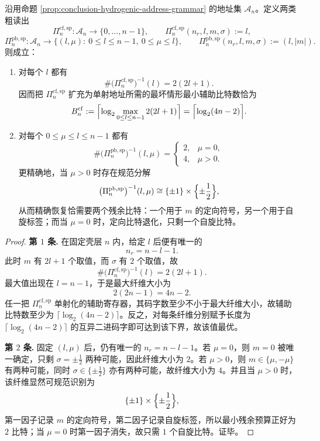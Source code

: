 \begin{theorem}[氢型粗读出的残余审计容量律]\label{thm:conclusion-hydrogenic-residual-audit-capacity}
沿用命题 \ref{prop:conclusion-hydrogenic-address-grammar} 的地址集 \(\mathcal A_n\)。定义两类粗读出
\[
\Pi_n^{\mathrm{cf,sp}}:\mathcal A_n\to \{0,\dots,n-1\},
\qquad
\Pi_n^{\mathrm{cf,sp}}(n_r,l,m,\sigma):=l,
\]
\[
\Pi_n^{\mathrm{pb,sp}}:\mathcal A_n\to \{(l,\mu):\ 0\le l\le n-1,\ 0\le \mu\le l\},
\qquad
\Pi_n^{\mathrm{pb,sp}}(n_r,l,m,\sigma):=(l,|m|).
\]
则成立：
\begin{enumerate}
  \item 对每个 \(l\) 都有
  \[
  \#\bigl(\Pi_n^{\mathrm{cf,sp}}\bigr)^{-1}(l)=2(2l+1).
  \]
  因而把 \(\Pi_n^{\mathrm{cf,sp}}\) 扩充为单射地址所需的最坏情形最小辅助比特数恰为
  \[
  B_n^{\mathrm{cf}}
  :=
  \Bigl\lceil
  \log_2
  \max_{0\le l\le n-1}2(2l+1)
  \Bigr\rceil
  =
  \Bigl\lceil \log_2(4n-2)\Bigr\rceil.
  \]
  \item 对每个 \(0\le \mu\le l\le n-1\) 都有
  \[
  \#\bigl(\Pi_n^{\mathrm{pb,sp}}\bigr)^{-1}(l,\mu)
  =
  \begin{cases}
  2, & \mu=0,\\[4pt]
  4, & \mu>0.
  \end{cases}
  \]
  更精确地，当 \(\mu>0\) 时存在规范分解
  \[
  \bigl(\Pi_n^{\mathrm{pb,sp}}\bigr)^{-1}(l,\mu)
  \cong
  \{\pm1\}\times \Bigl\{\pm\frac12\Bigr\},
  \]
  从而精确恢复恰需要两个残余比特：一个用于 \(m\) 的定向符号，另一个用于自旋标签；而当 \(\mu=0\) 时，定向比特退化，只剩一个自旋比特。
\end{enumerate}
\end{theorem}
\begin{proof}
\textbf{第 \(1\) 条.}
在固定壳层 \(n\) 内，给定 \(l\) 后便有唯一的
\[
n_r=n-l-1.
\]
此时 \(m\) 有 \(2l+1\) 个取值，而 \(\sigma\) 有 \(2\) 个取值，故
\[
\#\bigl(\Pi_n^{\mathrm{cf,sp}}\bigr)^{-1}(l)=2(2l+1).
\]
最大值出现在 \(l=n-1\)，于是最大纤维大小为
\[
2(2n-1)=4n-2.
\]
任一把 \(\Pi_n^{\mathrm{cf,sp}}\) 单射化的辅助寄存器，其码字数至少不小于最大纤维大小，故辅助比特数至少为 \(\lceil\log_2(4n-2)\rceil\)。反之，对每条纤维分别赋予长度为 \(\lceil\log_2(4n-2)\rceil\) 的互异二进码字即可达到该下界，故该值最优。

\textbf{第 \(2\) 条.}
固定 \((l,\mu)\) 后，仍有唯一的 \(n_r=n-l-1\)。若 \(\mu=0\)，则 \(m=0\) 被唯一确定，只剩 \(\sigma=\pm\tfrac12\) 两种可能，因此纤维大小为 \(2\)。若 \(\mu>0\)，则 \(m\in\{\mu,-\mu\}\) 有两种可能，同时 \(\sigma\in\{\pm\tfrac12\}\) 亦有两种可能，故纤维大小为 \(4\)。并且当 \(\mu>0\) 时，该纤维显然可规范识别为
\[
\{\pm1\}\times \Bigl\{\pm\frac12\Bigr\},
\]
第一因子记录 \(m\) 的定向符号，第二因子记录自旋标签，所以最小残余预算正好为 \(2\) 比特；当 \(\mu=0\) 时第一因子消失，故只需 \(1\) 个自旋比特。证毕。
\end{proof}


\endinput
